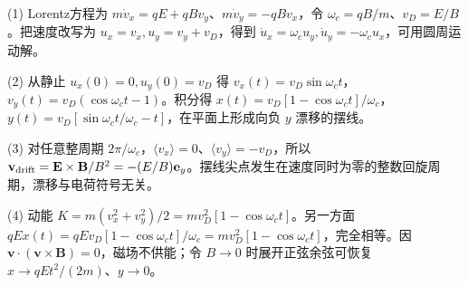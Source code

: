 (1) Lorentz方程为 \(m\dot v_x=qE+qBv_y\)、\(m\dot v_y=-qBv_x\)，令 \(\omega_c=qB/m\)、\(v_D=E/B\)。把速度改写为 \(u_x=v_x,u_y=v_y+v_D\)，得到 \(\dot u_x=\omega_c u_y,\dot u_y=-\omega_c u_x\)，可用圆周运动解。

(2) 从静止 \(u_x(0)=0,u_y(0)=v_D\) 得 \(v_x(t)=v_D\sin\omega_ct\)，\(v_y(t)=v_D(\cos\omega_ct-1)\)。积分得 \(\boxed{x(t)=v_D[1-\cos\omega_ct]/\omega_c}\)，\(\boxed{y(t)=v_D[\sin\omega_ct/\omega_c-t]}\)，在平面上形成向负 \(y\) 漂移的摆线。

(3) 对任意整周期 \(2\pi/\omega_c\)，\(\langle v_x\rangle=0\)、\(\langle v_y\rangle=-v_D\)，所以 \(\mathbf v_{\rm drift}=\mathbf E\times\mathbf B/B^2=-(E/B)\mathbf e_y\)。摆线尖点发生在速度同时为零的整数回旋周期，漂移与电荷符号无关。

(4) 动能 \(K=m(v_x^2+v_y^2)/2=mv_D^2[1-\cos\omega_ct]\)。另一方面 \(qEx(t)=qEv_D[1-\cos\omega_ct]/\omega_c=mv_D^2[1-\cos\omega_ct]\)，完全相等。因 \(\mathbf v\cdot(\mathbf v\times\mathbf B)=0\)，磁场不供能；令 \(B\to0\) 时展开正弦余弦可恢复 \(x\to qEt^2/(2m)\)、\(y\to0\)。
